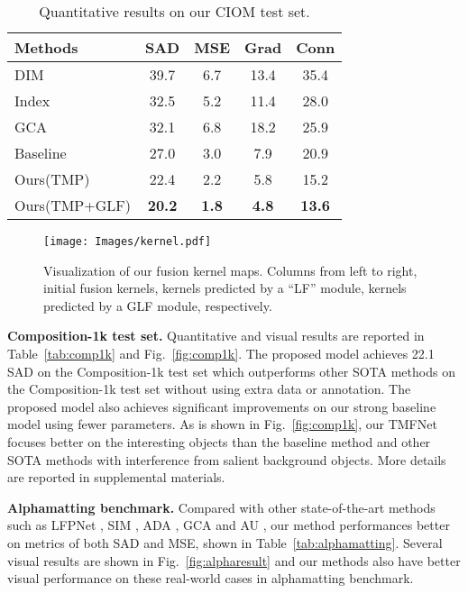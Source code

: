 \documentclass[10pt,twocolumn,letterpaper]{article}
\begin{document}
\begin{table}[h]
    \begin{center}
    \caption{Quantitative results on our CIOM test set.}
    \begin{tabular}{l|cccc}
        \hline
        Methods & SAD & MSE  & Grad & Conn \\
        \hline
        DIM \cite{deepmatting}          & 39.7 & 6.7 & 13.4 & 35.4 \\
        Index \cite{indexnet}           & 32.5 & 5.2 & 11.4 & 28.0 \\
        GCA  \cite{gca}       & 32.1 & 6.8 & 18.2 & 25.9 \\
        \hline
        Baseline & 27.0 & 3.0 & 7.9 & 20.9 \\
        Ours(TMP) & 22.4 & 2.2 & 5.8 & 15.2 \\
       Ours(TMP+GLF) & \textbf{20.2} & \textbf{1.8} & \textbf{4.8} & \textbf{13.6} \\
        \hline
    \end{tabular}

    \label{tab:ciom}
    \end{center}
\end{table}
\begin{figure}[t]
		\centering
		\texttt{[image: Images/kernel.pdf]}
		\caption{ Visualization of our fusion kernel maps. Columns from left to right, initial fusion kernels, kernels predicted by a ``LF'' module,   kernels predicted by a GLF module, respectively.}
		\label{fig:kernel}
\end{figure}

\textbf{Composition-1k test set.} Quantitative and visual results are reported in Table~\ref{tab:comp1k} and Fig.~\ref{fig:comp1k}. The proposed model achieves 22.1 SAD on the Composition-1k test set which outperforms other SOTA methods on the Composition-1k test set without using extra data or annotation. The proposed model also achieves significant improvements on our strong baseline model using fewer parameters. As is shown in Fig.~\ref{fig:comp1k}, our TMFNet  focuses better on the interesting objects than the baseline method and other SOTA methods \cite{gca,indexnet} with interference from salient background objects. More details are reported in supplemental materials.

\textbf{Alphamatting benchmark.} Compared with other state-of-the-art methods such as LFPNet \cite{lfpnet}, SIM \cite{sim}, ADA \cite{adamatting}, GCA \cite{gca} and AU \cite{a2u}, our method performances better on metrics of both SAD and MSE, shown in Table~\ref{tab:alphamatting}. Several visual results are shown in Fig.~\ref{fig:alpharesult} and our methods also have better visual performance on these real-world cases in alphamatting \cite{alphamatting} benchmark.
\end{document}
